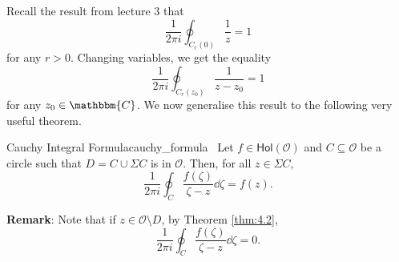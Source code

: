 \documentclass[../ComplexAnalysis_Notes.tex]{subfiles}
\begin{document}
Recall the result from lecture 3 that
\[ 
 \frac{1}{2\pi i} \oint_{C_r(0)} \frac{1}{z} = 1
 \]
 for any \( r > 0 \). Changing variables, we get the equality
 \[ 
  \frac{1}{2\pi i} \oint_{C_r(z_0)} \frac{1}{z-z_0} = 1
  \]
for any \( z_0 \in \mathbbm{C} \). We now generalise this result to the following very useful theorem.

\begin{Thm}{Cauchy Integral Formula}{cauchy_formula}
 \, Let \( f \in \textsf{Hol}(\mathcal{O}) \) and \( C \subseteq \mathcal{O} \) be a circle such that \( D = C \cup \Sigma C \) is in \( \mathcal{O} \). Then, for all \( z \in \Sigma C \),
 \[ 
  \frac{1}{2\pi i} \oint_C \frac{f(\zeta)}{\zeta-z}\dd{\zeta} = f(z).
  \]
 \end{Thm}

\textbf{Remark}: Note that if \( z \in \mathcal{O} \setminus D \), by Theorem \ref{thm:4.2},
\[ 
  \frac{1}{2\pi i} \oint_C \frac{f(\zeta)}{\zeta-z}\dd{\zeta} = 0.
 \]
\end{document}
